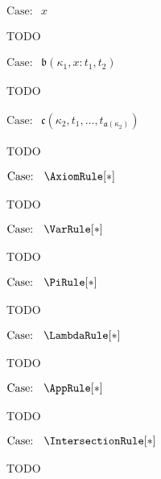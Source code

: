 

$\text{Case: }\begin{array}{c} x \end{array}$
\begin{proofcase}
    TODO
\end{proofcase}

$\text{Case: }\begin{array}{c} \mathfrak{b}(\kappa_1, x : t_1, t_2) \end{array}$
\begin{proofcase}
    TODO
\end{proofcase}

$\text{Case: }\begin{array}{c} \mathfrak{c}(\kappa_2, t_1, \ldots, t_{\mathfrak{a}(\kappa_2)}) \end{array}$
\begin{proofcase}
    TODO
\end{proofcase}


$\text{Case: }\begin{array}{c} \AxiomRule[*] \end{array}$
\begin{proofcase}
    TODO
\end{proofcase}

$\text{Case: }\begin{array}{c} \VarRule[*] \end{array}$
\begin{proofcase}
    TODO
\end{proofcase}

$\text{Case: }\begin{array}{c} \PiRule[*] \end{array}$
\begin{proofcase}
    TODO
\end{proofcase}

$\text{Case: }\begin{array}{c} \LambdaRule[*] \end{array}$
\begin{proofcase}
    TODO
\end{proofcase}

$\text{Case: }\begin{array}{c} \AppRule[*] \end{array}$
\begin{proofcase}
    TODO
\end{proofcase}

$\text{Case: }\begin{array}{c} \IntersectionRule[*] \end{array}$
\begin{proofcase}
    TODO
\end{proofcase}


